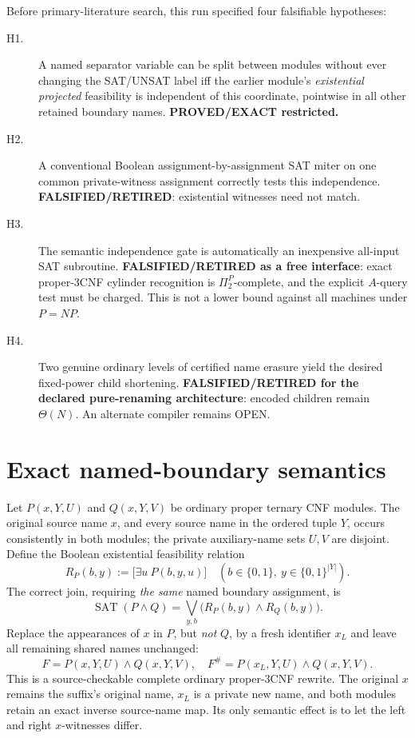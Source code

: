 \documentclass[11pt]{article}
\newcommand{\SAT}{\operatorname{SAT}}
\begin{document}
Before primary-literature search, this run specified four falsifiable hypotheses:
\begin{description}
\item[H1.] A named separator variable can be split between modules without ever changing the SAT/UNSAT label iff the earlier module's \emph{existential projected} feasibility is independent of this coordinate, pointwise in all other retained boundary names. \textbf{PROVED/EXACT restricted.}
\item[H2.] A conventional Boolean assignment-by-assignment SAT miter on one common private-witness assignment correctly tests this independence. \textbf{FALSIFIED/RETIRED}: existential witnesses need not match.
\item[H3.] The semantic independence gate is automatically an inexpensive all-input SAT subroutine. \textbf{FALSIFIED/RETIRED as a free interface}: exact proper-3CNF cylinder recognition is \(\Pi_2^P\)-complete, and the explicit \(A\)-query test must be charged. This is not a lower bound against all machines under \(P=NP\).
\item[H4.] Two genuine ordinary levels of certified name erasure yield the desired fixed-power child shortening. \textbf{FALSIFIED/RETIRED for the declared pure-renaming architecture}: encoded children remain \(\Theta(N)\). An alternate compiler remains OPEN.
\end{description}

\section{Exact named-boundary semantics}
Let \(P(x,Y,U)\) and \(Q(x,Y,V)\) be ordinary proper ternary CNF modules. The original source name \(x\), and every source name in the ordered tuple \(Y\), occurs consistently in both modules; the private auxiliary-name sets \(U,V\) are disjoint. Define the Boolean existential feasibility relation
\[
 R_P(b,y):=\bigl[\exists u\ P(b,y,u)\bigr]\quad
 (b\in\{0,1\},\ y\in\{0,1\}^{|Y|}).
\]
The correct join, requiring \emph{the same} named boundary assignment, is
\[
 \SAT(P\wedge Q)=
 \bigvee_{y,b}\bigl(R_P(b,y)\wedge R_Q(b,y)\bigr). \tag{1}
\]
Replace the appearances of \(x\) in \(P\), but \emph{not} \(Q\), by a fresh identifier \(x_L\) and leave all remaining shared names unchanged:
\[
 F=P(x,Y,U)\wedge Q(x,Y,V),\quad
 F^\#=P(x_L,Y,U)\wedge Q(x,Y,V). \tag{2}
\]
This is a source-checkable complete ordinary proper-3CNF rewrite. The original \(x\) remains the suffix's original name, \(x_L\) is a private new name, and both modules retain an exact inverse source-name map. Its only semantic effect is to let the left and right \(x\)-witnesses differ.
\end{document}

